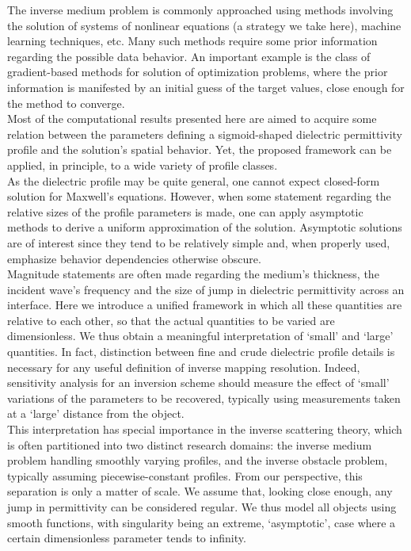 \documentclass[12pt,twoside]{report}
\begin{document}
The inverse medium problem is commonly approached using methods involving the solution of systems of nonlinear equations (a strategy we take here), machine learning techniques, etc. Many such methods require some prior information regarding the possible data behavior. An important example is the class of gradient-based methods for solution of optimization problems, where the prior information is manifested by an initial guess of the target values, close enough for the method to converge.\\
Most of the computational results presented here are aimed to acquire some relation between the parameters defining a sigmoid-shaped dielectric permittivity profile and the solution's spatial behavior. Yet, the proposed framework can be applied, in principle, to a wide variety of profile classes.\\

As the dielectric profile may be quite general, one cannot expect closed-form solution for Maxwell's equations. However, when some statement regarding the relative sizes of the profile parameters is made, one can apply asymptotic methods to derive a uniform approximation of the solution. Asymptotic solutions are of interest since they tend to be relatively simple and, when properly used, emphasize behavior dependencies otherwise obscure.\\

Magnitude statements are often made regarding the medium's thickness, the incident wave's frequency and the size of jump in dielectric permittivity across an interface. Here we introduce a unified framework in which all these quantities are relative to each other, so that the actual quantities to be varied are dimensionless. We thus obtain a meaningful interpretation of `small' and `large' quantities. In fact, distinction between fine and crude dielectric profile details is necessary for any useful definition of inverse mapping resolution. Indeed, sensitivity analysis for an inversion scheme should measure the effect of `small' variations of the parameters to be recovered, typically using measurements taken at a `large' distance from the object.\\
This interpretation has special importance in the inverse scattering theory, which is often partitioned into two distinct research domains: the inverse medium problem handling smoothly varying profiles, and the inverse obstacle problem, typically assuming piecewise-constant profiles. From our perspective, this separation is only a matter of scale. We assume that, looking close enough, any jump in permittivity can be considered regular. We thus model all objects using smooth functions, with singularity being an extreme, `asymptotic', case where a certain dimensionless parameter tends to infinity. \\
\end{document}
